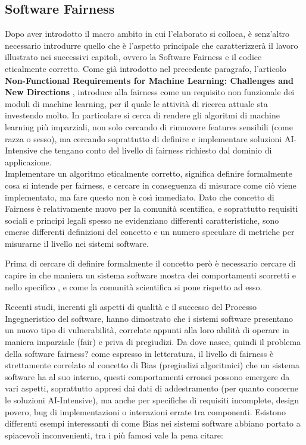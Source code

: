 \subsection{Software Fairness}
Dopo aver introdotto il macro ambito in cui l'elaborato si colloca, è senz'altro necessario introdurre quello che è l'aspetto principale che caratterizzerà il lavoro illustrato nei successivi capitoli, ovvero la Software Fairness e il codice eticalmente corretto. Come già introdotto nel precedente paragrafo, l'articolo \textbf{Non-Functional Requirements for Machine Learning: Challenges and New Directions} \cite{NFRForML}, introduce alla fairness come un requisito non funzionale dei moduli di machine learning, per il quale  le attività di ricerca attuale sta investendo molto. In particolare si cerca di rendere gli algoritmi di machine learning più imparziali, non solo cercando di rimuovere features sensibili (come razza o sesso), ma cercando soprattutto di definire e implementare soluzioni AI-Intensive che tengano conto del livello di fairness richiesto dal dominio di applicazione.\\

\cite{NFRForML} Implementare un algoritmo eticalmente corretto, significa definire formalmente cosa si intende per fairness, e cercare in conseguenza di misurare come ciò  viene implementato, \cite{evalFairClassification} ma fare questo non è così immediato. Dato che  concetto di Fairness è relativamente nuovo per la comunità scentifica, e soprattutto requisiti sociali e principi legali spesso ne evidenziano differenti caratteristiche,  sono emerse differenti definizioni del concetto e un numero speculare di metriche per misurarne il livello nei sistemi software.

Prima di cercare di definire formalmente il concetto però è necessario cercare di capire in che maniera un sistema software mostra dei comportamenti scorretti e nello specifico , e come la comunità scientifica si pone rispetto ad esso.   

\cite{brun2018software} Recenti studi, inerenti gli aspetti di qualità e il successo del Processo Ingegneristico del software, hanno dimostrato che i sistemi software presentano un nuovo tipo di vulnerabilità, correlate appunti alla loro abilità di operare in maniera imparziale (fair) e priva di pregiudizi. Da dove nasce, quindi il problema della software fairness? \cite{brun2018software} come espresso in letteratura, il livello di fairness è strettamente correlato al concetto di Bias (pregiudizi algoritmici) che un sistema software ha al suo interno, questi comportamenti erronei possono emergere da vari aspetti, soprattutto appresi dai dati di addestramento (per quanto concerne le soluzioni AI-Intensive), ma anche per specifiche di requisiti incomplete, design povero, bug di implementazioni o interazioni errate tra componenti. Esistono differenti esempi interessanti di come Bias nei sistemi software abbiano portato a spiacevoli inconvenienti, tra i più famosi vale la pena citare:

